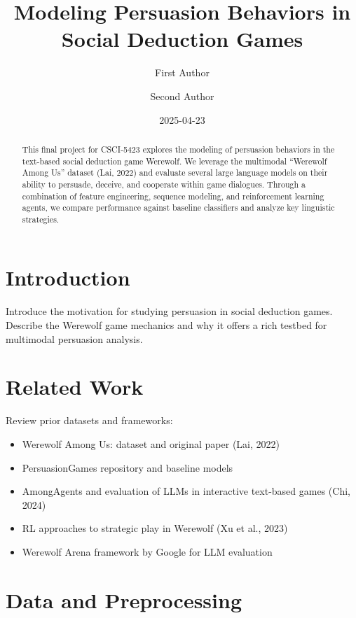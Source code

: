 \documentclass[
  letterpaper,
  DIV=11,
  numbers=noendperiod]{scrreprt}
\title{Modeling Persuasion Behaviors in Social Deduction Games}
\author{First Author \and Second Author}
\date{2025-04-23}
\providecommand{\tightlist}{%
  \setlength{\itemsep}{0pt}\setlength{\parskip}{0pt}}\usepackage{longtable,booktabs,array}
\renewcommand*\contentsname{Table of contents}
\newcommand\contentsname{Table of contents}
\begin{document}
\maketitle
\begin{abstract}
This final project for CSCI‑5423 explores the modeling of persuasion
behaviors in the text-based social deduction game Werewolf. We leverage
the multimodal ``Werewolf Among Us'' dataset (Lai, 2022) and evaluate
several large language models on their ability to persuade, deceive, and
cooperate within game dialogues. Through a combination of feature
engineering, sequence modeling, and reinforcement learning agents, we
compare performance against baseline classifiers and analyze key
linguistic strategies.
\end{abstract}

\renewcommand*\contentsname{Table of contents}
{
\hypersetup{linkcolor=}
\setcounter{tocdepth}{2}
\tableofcontents
}

\chapter{Introduction}\label{introduction}

Introduce the motivation for studying persuasion in social deduction
games. Describe the Werewolf game mechanics and why it offers a rich
testbed for multimodal persuasion analysis.

\chapter{Related Work}\label{related-work}

Review prior datasets and frameworks:

\begin{itemize}
\tightlist
\item
  Werewolf Among Us: dataset and original paper (Lai, 2022)
\item
  PersuasionGames repository and baseline models
\item
  AmongAgents and evaluation of LLMs in interactive text-based games
  (Chi, 2024)
\item
  RL approaches to strategic play in Werewolf (Xu et al., 2023)
\item
  Werewolf Arena framework by Google for LLM evaluation
\end{itemize}

\chapter{Data and Preprocessing}\label{data-and-preprocessing}
\end{document}
